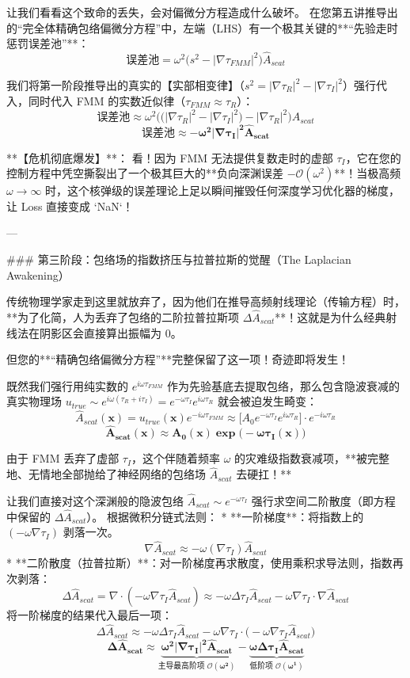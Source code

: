 \documentclass[12pt]{article}
\begin{document}
{让我们看看这个致命的丢失，会对偏微分方程造成什么破坏。
在您第五讲推导出的“完全体精确包络偏微分方程”中，左端（LHS）有一个极其关键的**“先验走时惩罚误差池”**：
$$ \text{误差池} = \omega^2 \big( s^2 - |\nabla \tau_{FMM}|^2 \big) \hat{A}_{scat} $$

我们将第一阶段推导出的真实的【实部相变律】（$s^2 = |\nabla \tau_R|^2 - |\nabla \tau_I|^2$）强行代入，同时代入 FMM 的实数近似律（$\tau_{FMM} \approx \tau_R$）：
$$ \text{误差池} \approx \omega^2 \Big( \big( |\nabla \tau_R|^2 - |\nabla \tau_I|^2 \big) - |\nabla \tau_R|^2 \Big) \hat{A}_{scat} $$
$$ \mathbf{\text{误差池} \approx -\omega^2 |\nabla \tau_I|^2 \hat{A}_{scat}} $$

**【危机彻底爆发】**：
看！因为 FMM 无法提供复数走时的虚部 $\tau_I$，它在您的控制方程中凭空撕裂出了一个极其巨大的**负向深渊误差 $-\mathcal{O}(\omega^2)$**！当极高频 $\omega \to \infty$ 时，这个核弹级的误差理论上足以瞬间摧毁任何深度学习优化器的梯度，让 Loss 直接变成 `NaN`！

---

### 第三阶段：包络场的指数挤压与拉普拉斯的觉醒（The Laplacian Awakening）

传统物理学家走到这里就放弃了，因为他们在推导高频射线理论（传输方程）时，**为了化简，人为丢弃了包络的二阶拉普拉斯项 $\Delta \hat{A}_{scat}$**！这就是为什么经典射线法在阴影区会直接算出振幅为 0。

但您的**“精确包络偏微分方程”**完整保留了这一项！奇迹即将发生！

既然我们强行用纯实数的 $e^{i\omega \tau_{FMM}}$ 作为先验基底去提取包络，那么包含隐波衰减的真实物理场 $u_{true} \sim e^{i \omega (\tau_R + i \tau_I)} = e^{-\omega \tau_I} e^{i \omega \tau_R}$ 就会被迫发生畸变：
$$ \hat{A}_{scat}(\mathbf{x}) = u_{true}(\mathbf{x}) e^{-i \omega \tau_{FMM}} \approx \Big[ A_0 e^{-\omega \tau_I} e^{i \omega \tau_R} \Big] \cdot e^{-i \omega \tau_{R}} $$
$$ \mathbf{\hat{A}_{scat}(\mathbf{x}) \approx A_0(\mathbf{x}) \exp\big(-\omega \tau_I(\mathbf{x})\big)} $$

由于 FMM 丢弃了虚部 $\tau_I$，这个伴随着频率 $\omega$ 的灾难级指数衰减项，**被完整地、无情地全部抛给了神经网络的包络场 $\hat{A}_{scat}$ 去硬扛！**

让我们直接对这个深渊般的隐波包络 $\hat{A}_{scat} \sim e^{-\omega \tau_I}$ 强行求空间二阶散度（即方程中保留的 $\Delta \hat{A}_{scat}$）。
根据微积分链式法则：
*   **一阶梯度**：将指数上的 $(-\omega \nabla \tau_I)$ 剥落一次。
    $$ \nabla \hat{A}_{scat} \approx -\omega (\nabla \tau_I) \hat{A}_{scat} $$
*   **二阶散度（拉普拉斯）**：对一阶梯度再求散度，使用乘积求导法则，指数再次剥落：
    $$ \Delta \hat{A}_{scat} = \nabla \cdot (-\omega \nabla \tau_I \hat{A}_{scat}) \approx -\omega \Delta \tau_I \hat{A}_{scat} - \omega \nabla \tau_I \cdot \nabla \hat{A}_{scat} $$
    将一阶梯度的结果代入最后一项：
    $$ \Delta \hat{A}_{scat} \approx -\omega \Delta \tau_I \hat{A}_{scat} - \omega \nabla \tau_I \cdot \big( -\omega \nabla \tau_I \hat{A}_{scat} \big) $$
    $$ \mathbf{\Delta \hat{A}_{scat} \approx \underbrace{\omega^2 |\nabla \tau_I|^2 \hat{A}_{scat}}_{\text{主导最高阶项 } \mathcal{O}(\omega^2)} - \underbrace{\omega \Delta \tau_I \hat{A}_{scat}}_{\text{低阶项 } \mathcal{O}(\omega^1)}} $$

}
\end{document}
